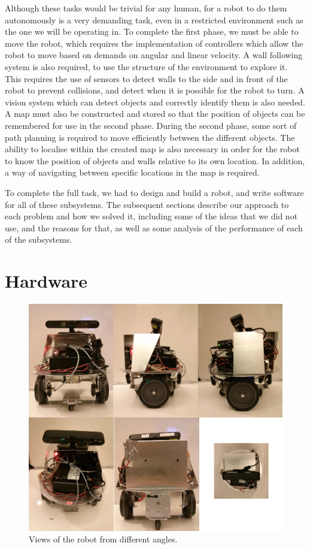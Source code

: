\documentclass[10pt,a4paper,twocolumn]{article}
\begin{document}
Although these tasks would be trivial for any human, for a robot to do them
autonomously is a very demanding task, even in a restricted environment such as
the one we will be operating in. To complete the first phase, we must be able to
move the robot, which requires the implementation of controllers which allow the
robot to move based on demands on angular and linear velocity. A wall following
system is also required, to use the structure of the environment to explore it.
This requires the use of sensors to detect walls to the side and in front of the
robot to prevent collisions, and detect when it is possible for the robot to
turn. A vision system which can detect objects and correctly identify them is
also needed. A map must also be constructed and stored so that the position of
objects can be remembered for use in the second phase. During the second phase,
some sort of path planning is required to move efficiently between the different
objects. The ability to localise within the created map is also necessary in
order for the robot to know the position of objects and walls relative to its
own location. In addition, a way of navigating between specific locations in the
map is required.

To complete the full task, we had to design and build a robot, and write
software for all of these subsystems. The subsequent sections describe our
approach to each problem and how we solved it, including some of the ideas that
we did not use, and the reasons for that, as well as some analysis of the
performance of each of the subsystems.


\section{Hardware}
\begin{figure}
  \centering
  \includegraphics[width=\linewidth]{images/robo_views.png}
  \caption{Views of the robot from different angles.}
  \label{fig:roboview}
\end{figure}
\end{document}
